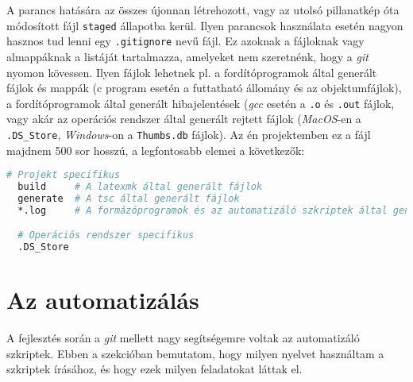 A parancs hatására az összes újonnan létrehozott, vagy az utolsó pillanatkép
óta módosított fájl \texttt{staged} állapotba kerül.  Ilyen parancsok
használata esetén nagyon hasznos tud lenni egy \texttt{.gitignore} nevű fájl.
Ez azoknak a fájloknak vagy almappáknak a listáját tartalmazza, amelyeket nem
szeretnénk, hogy a \textit{git} nyomon kövessen. Ilyen fájlok lehetnek pl. a
fordítóprogramok által generált fájlok és mappák (c program esetén a futtatható
állomány és az objektumfájlok), a fordítóprogramok által generált hibajelentések
(\textit{gcc} esetén a \texttt{.o} és \texttt{.out} fájlok, vagy akár az
operációs rendszer által generált rejtett fájlok (\textit{MacOS}-en a
\texttt{.DS\_Store},  \textit{Windows}-on a \texttt{Thumbs.db} fájlok).
Az én projektemben ez a fájl majdnem 500 sor hosszú, a legfontosabb elemei
a következők:
\begin{lstlisting}[caption={A projektemben található \texttt{.gitignore} fájl legfontosabb részei},language=sh]
  # Projekt specifikus
  build     # A latexmk által generált fájlok
  generate  # A tsc által generált fájlok
  *.log     # A formázóprogramok és az automatizáló szkriptek által generált fájlok

  # Operációs rendszer specifikus
  .DS_Store
\end{lstlisting}



\section{Az automatizálás}

A fejlesztés során a \textit{git} mellett nagy segítségemre voltak az
automatizáló szkriptek. Ebben a szekcióban bemutatom, hogy milyen nyelvet
használtam a szkriptek írásához, és hogy ezek milyen feladatokat láttak el.


